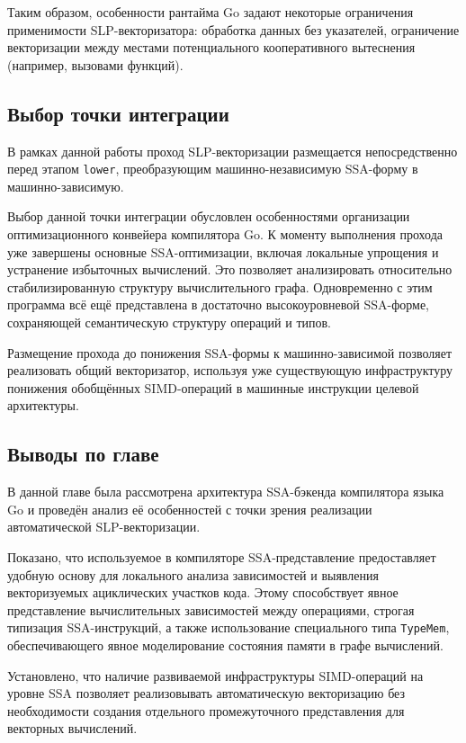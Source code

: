 Таким образом, особенности рантайма Go задают некоторые ограничения применимости SLP-векторизатора: обработка данных без указателей, 
ограничение векторизации между местами потенциального кооперативного вытеснения (например, вызовами функций).

\subsection{Выбор точки интеграции}
\label{sec:integration_point}

В рамках данной работы проход SLP-векторизации размещается непосредственно перед этапом \texttt{lower}, преобразующим машинно-независимую SSA-форму в машинно-зависимую.

Выбор данной точки интеграции обусловлен особенностями организации оптимизационного конвейера компилятора Go.
К моменту выполнения прохода уже завершены основные SSA-оптимизации, включая локальные упрощения и устранение избыточных вычислений.
Это позволяет анализировать относительно стабилизированную структуру вычислительного графа. Одновременно с этим программа всё ещё представлена в
достаточно высокоуровневой SSA-форме, сохраняющей семантическую структуру операций и типов.

Размещение прохода до понижения SSA-формы к машинно-зависимой позволяет реализовать общий векторизатор, используя уже существующую инфраструктуру
понижения обобщённых SIMD-операций в машинные инструкции целевой архитектуры.

\subsection{Выводы по главе}
\label{sec:go_conclusion}

В данной главе была рассмотрена архитектура SSA-бэкенда компилятора языка Go и проведён анализ её особенностей с точки зрения реализации автоматической SLP-векторизации.

Показано, что используемое в компиляторе SSA-представление предоставляет удобную основу для локального анализа зависимостей и выявления векторизуемых
ациклических участков кода. Этому способствует явное представление вычислительных зависимостей между операциями, строгая типизация SSA-инструкций, 
а также использование специального типа \texttt{TypeMem}, обеспечивающего явное моделирование состояния памяти в графе вычислений.

Установлено, что наличие развиваемой инфраструктуры SIMD-операций на уровне SSA позволяет реализовывать автоматическую
векторизацию без необходимости создания отдельного промежуточного представления для векторных вычислений.

